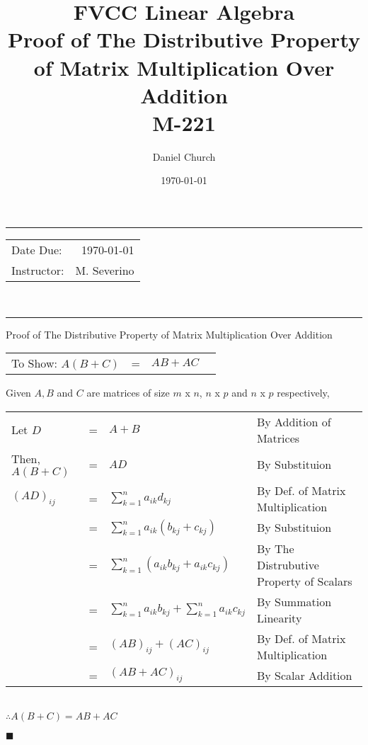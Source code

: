 \documentclass{article}
\title{FVCC Linear Algebra\\ Proof of The Distributive Property of Matrix Multiplication Over Addition  \\ M-221}
\author{Daniel Church}
\date{\today}
\begin{document}
\maketitle
\noindent
\rule[4mm]{17cm}{2pt}
\begin{tabular}{l r}
Date Due: & \today \\
Instructor: & M. Severino
\end{tabular}\\
\rule[4mm]{17cm}{2pt}

\newpage
{\centering
\LARGE Proof of The Distributive Property of Matrix Multiplication Over Addition \par
}
\begin{tabular}{@{}l l l @{\hskip 2.5in}l}
To Show: $A(B+C)$ & = & $AB + AC$ & 
\end{tabular}

Given $A, B$ and $C$ are matrices of size $m$ x $n$, $n$ x $p$ and $n$ x $p$ respectively,

\begin{tabular}{@{}l l l @{\hskip 1.5in}l}
Let $D$ & = & $A+B$ & By Addition of Matrices\\
Then, $A(B+C)$ & = & $AD$ & By Substituion\\
$(AD)_{ij}$ & = & $\displaystyle\sum_{k=1}^{n} a_{ik}d_{kj}$ & By Def. of Matrix Multiplication\\
 & = & $\displaystyle\sum_{k=1}^{n} a_{ik}(b_{kj}+c_{kj})$ & By Substituion\\
 & = & $\displaystyle\sum_{k=1}^{n} (a_{ik}b_{kj}+a_{ik}c_{kj})$ & By The Distrubutive Property of Scalars\\
& = & $\displaystyle\sum_{k=1}^{n} a_{ik}b_{kj} + \displaystyle\sum_{k=1}^{n} a_{ik}c_{kj}$ & By Summation Linearity\\
& = & $(AB)_{ij}+(AC)_{ij}$ & By Def. of Matrix Multiplication\\
& = & $(AB+AC)_{ij}$ & By Scalar Addition \\
\end{tabular}\\

$\therefore A(B+C) = AB + AC $
\begin{flushright}
$\blacksquare$
\end{flushright}
\end{document}
